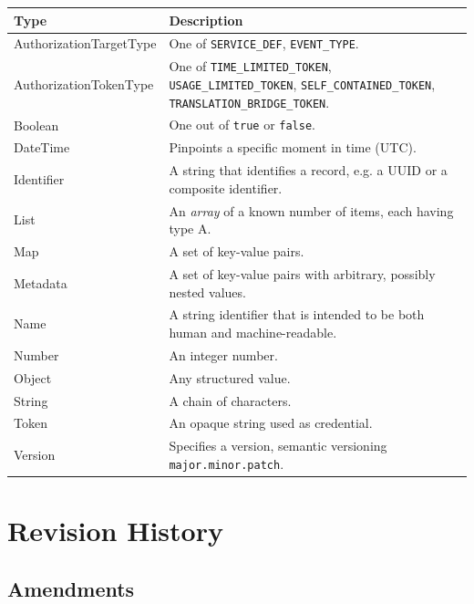 \documentclass[a4paper]{arrowhead}
\newcommand{\pdef}[1]{{\textcolor{ArrowheadGrey}{#1\label{sec:model:primitives:#1}\label{sec:model:primitives:#1s}\label{sec:model:primitives:#1es}}}}
\begin{document}
\noindent\begin{tabularx}{\textwidth}{| p{4.6cm} | X |} \hline
\rowcolor{gray!33} Type & Description \\ \hline
\pdef{AuthorizationTargetType} & One of \texttt{SERVICE\_\allowbreak{}DEF}, \texttt{EVENT\_\allowbreak{}TYPE}. \\ \hline
\pdef{AuthorizationTokenType} & One of \texttt{TIME\_\allowbreak{}LIMITED\_\allowbreak{}TOKEN}, \texttt{USAGE\_\allowbreak{}LIMITED\_\allowbreak{}TOKEN}, \texttt{SELF\_\allowbreak{}CONTAINED\_\allowbreak{}TOKEN}, \texttt{TRANSLATION\_\allowbreak{}BRIDGE\_\allowbreak{}TOKEN}. \\ \hline
\pdef{Boolean} & One out of \texttt{true} or \texttt{false}. \\ \hline
\pdef{DateTime} & Pinpoints a specific moment in time (UTC). \\ \hline
\pdef{Identifier} & A string that identifies a record, e.g. a UUID or a composite identifier. \\ \hline
\pdef{List} & An \textit{array} of a known number of items, each having type A. \\ \hline
\pdef{Map} & A set of key-value pairs. \\ \hline
\pdef{Metadata} & A set of key-value pairs with arbitrary, possibly nested values. \\ \hline
\pdef{Name} & A string identifier that is intended to be both human and machine-readable. \\ \hline
\pdef{Number} & An integer number. \\ \hline
\pdef{Object} & Any structured value. \\ \hline
\pdef{String} & A chain of characters. \\ \hline
\pdef{Token} & An opaque string used as credential. \\ \hline
\pdef{Version} & Specifies a version, semantic versioning \texttt{major.minor.patch}. \\ \hline
\end{tabularx}

\newpage




\newpage

\section{Revision History}
\subsection{Amendments}
\end{document}
